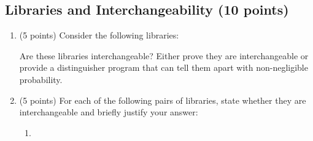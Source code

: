 \documentclass[10pt,a4paper,american]{article}
\begin{document}
\subsection{Libraries and Interchangeability (10 points)}

\begin{enumerate}
	\item (5 points) Consider the following libraries:
	      \begin{center}
	      \end{center}
	      Are these libraries interchangeable? Either prove they are interchangeable or provide a distinguisher program that can tell them apart with non-negligible probability.

	\item (5 points) For each of the following pairs of libraries, state whether they are interchangeable and briefly justify your answer:
	      \begin{enumerate}
		      \item
		            \begin{center}
		            \end{center}


\end{enumerate}
\end{enumerate}
\end{document}
